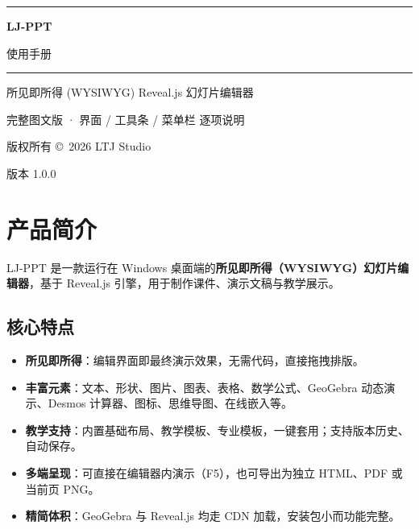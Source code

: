 \documentclass[12pt,a4paper]{ctexart}
\begin{document}
\begin{titlepage}
\centering
\vspace*{2.6cm}
{\color{ljpurple}\rule{\linewidth}{2.5pt}}
\vspace{1.2cm}
{\Huge\bfseries\color{ljpurple} LJ-PPT\par}
\vspace{0.6cm}
{\Large 使用手册\par}
\vspace{0.4cm}
{\color{ljpurple2}\rule{0.55\linewidth}{1pt}}
\vspace{1cm}
{\large 所见即所得 (WYSIWYG) Reveal.js 幻灯片编辑器\par}
\vspace{0.3cm}
{\normalsize\color{gray} 完整图文版 · 界面 / 工具条 / 菜单栏 逐项说明\par}
\vspace{3.0cm}
\vfill
{\small\color{gray} 版权所有 \copyright\ 2026 LTJ Studio\par}
{\footnotesize\color{gray} 版本 1.0.0\par}
\end{titlepage}

\tableofcontents
\newpage

\section{产品简介}
LJ-PPT 是一款运行在 Windows 桌面端的\textbf{所见即所得（WYSIWYG）幻灯片编辑器}，基于 Reveal.js 引擎，用于制作课件、演示文稿与教学展示。

\subsection{核心特点}
\begin{itemize}
  \item \textbf{所见即所得}：编辑界面即最终演示效果，无需代码，直接拖拽排版。
  \item \textbf{丰富元素}：文本、形状、图片、图表、表格、数学公式、GeoGebra 动态演示、Desmos 计算器、图标、思维导图、在线嵌入等。
  \item \textbf{教学支持}：内置基础布局、教学模板、专业模板，一键套用；支持版本历史、自动保存。
  \item \textbf{多端呈现}：可直接在编辑器内演示（F5），也可导出为独立 HTML、PDF 或当前页 PNG。
  \item \textbf{精简体积}：GeoGebra 与 Reveal.js 均走 CDN 加载，安装包小而功能完整。
\end{itemize}
\end{document}

